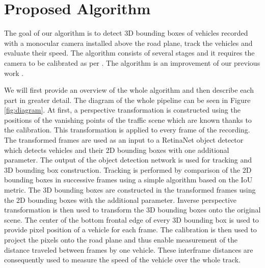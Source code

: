 \documentclass[twocolumn]{svjour3}          \smartqed  \usepackage{graphicx}
\begin{document}
\section{Proposed Algorithm}

The goal of our algorithm is to detect 3D bounding boxes of vehicles recorded with a monocular camera installed above the road plane, track the vehicles and evaluate their speed. The algorithm consists of several stages and it requires the camera to be calibrated as per \cite{sochor2017}. The algorithm is an improvement of our previous work \cite{CVWW2019}.

We will first provide an overview of the whole algorithm and then describe each part in greater detail. The diagram of the whole pipeline can be seen in Figure \ref{fig:diagram}. At first, a perspective transformation is constructed using the positions of the vanishing points of the traffic scene which are known thanks to the calibration. This transformation is applied to every frame of the recording. The transformed frames are used as an input to a RetinaNet object detector which detects vehicles and their 2D bounding boxes with one additional parameter. The output of the object detection network is used for tracking and 3D bounding box construction. Tracking is performed by comparison of the 2D bounding boxes in successive frames using a simple algorithm based on the IoU metric. The 3D bounding boxes are constructed in the transformed frames using the 2D bounding boxes with the additional parameter. Inverse perspective transformation is then used to transform the 3D bounding boxes onto the original scene. The center of the bottom frontal edge of every 3D bounding box is used to provide pixel position of a vehicle for each frame. The calibration is then used to project the pixels onto the road plane and thus enable measurement of the distance traveled between frames by one vehicle. These interframe distances are consequently used to measure the speed of the vehicle over the whole track.
\end{document}
